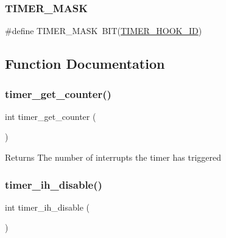 \mbox{\label{group__timer_gae41604e470c014060c92349437078e03}} 
\subsubsection{\texorpdfstring{T\+I\+M\+E\+R\+\_\+\+M\+A\+SK}{TIMER\_MASK}}
{\footnotesize\ttfamily \#define T\+I\+M\+E\+R\+\_\+\+M\+A\+SK~B\+IT(\hyperlink{group__timer_gacaa139b4a451d80a4cb00da3451edd5b}{T\+I\+M\+E\+R\+\_\+\+H\+O\+O\+K\+\_\+\+ID})}



\subsection{Function Documentation}
\mbox{\label{group__timer_gacbda5965336eef31790e7a8b983332ff}} 
\subsubsection{\texorpdfstring{timer\+\_\+get\+\_\+counter()}{timer\_get\_counter()}}
{\footnotesize\ttfamily int timer\+\_\+get\+\_\+counter (\begin{DoxyParamCaption}{ }\end{DoxyParamCaption})}

\begin{DoxyReturn}{Returns}
The number of interrupts the timer has triggered 
\end{DoxyReturn}
\mbox{\label{group__timer_ga4a90bd229401205fbf0222cc3228c22c}} 
\subsubsection{\texorpdfstring{timer\+\_\+ih\+\_\+disable()}{timer\_ih\_disable()}}
{\footnotesize\ttfamily int timer\+\_\+ih\+\_\+disable (\begin{DoxyParamCaption}{ }\end{DoxyParamCaption})}



